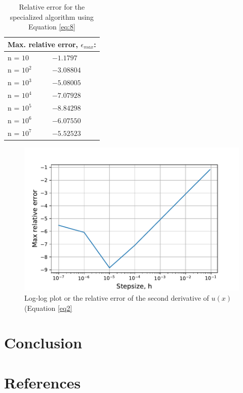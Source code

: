 \documentclass{article}
\begin{document}
\begin{table}[]
\centering
\begin{tabular}{ll}
\multicolumn{2}{c}{\textbf{Max. relative error, $\epsilon_{max}$:}} \\ \hline
n = $10$                                  & $-1.1797$                                \\
n = $10^2$                                & $-3.08804$                               \\
n = $10^3$                                & $-5.08005$                               \\
n = $10^4$                                & $-7.07928$                               \\
n = $10^5$                                & $-8.84298$                                \\
n = $10^6$                                & $-6.07550$                               \\
n = $10^7$                                & $-5.52523$                              
\end{tabular}
\label{tab:2}
\caption{Relative error for the specialized algorithm using Equation \ref{eq:8}}
\end{table}


\begin{figure}[h]
    \centering
    \includegraphics[width =12cm]{python/relative_error.pdf}
    \caption{Log-log plot or the relative error of the second derivative of $u(x)$ (Equation \ref{eq2}}
    \label{fig:re}
\end{figure}


\section{Conclusion}

\section{References}
\end{document}

